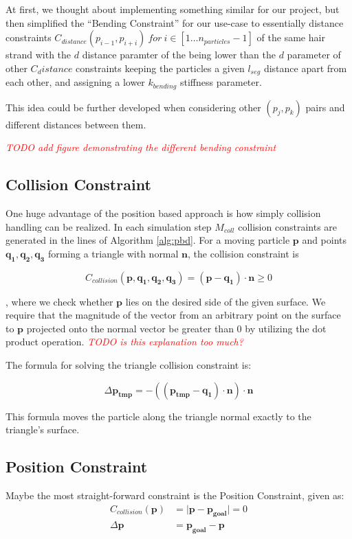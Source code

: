 \documentclass[sigplan,screen,nonacm]{acmart}
\newcommand\TODO[1]{\textcolor{red}{\emph{TODO #1}}}
\renewcommand{\b}{\boldsymbol}
\begin{document}
At first, we thought about implementing something similar for our project, but
then simplified the ``Bending Constraint'' for our use-case to essentially
 distance constraints $C_{distance}(p_{i-1}, p_{i+i})~for~i\in[1 \ldots
n_{particles}-1]$ of the same hair strand with the $d$ distance paramter of the
being lower than the $d$ parameter of other $C_distance$ constraints keeping the
particles a given $l_{seg}$ distance apart from each other, and assigning
a lower $k_{bending}$ stiffness parameter.

This idea could be further developed when considering other $(p_j,p_k)$ pairs
and different distances between them.

\TODO{add figure demonstrating the different bending constraint}

\subsection{Collision Constraint}
One huge advantage of the position based approach is how simply collision
handling can be realized. In each simulation step $M_{coll}$ collision
constraints are generated in the  lines of Algorithm
\ref{alg:pbd}. For a moving particle $\b{p}$ and points $\b{q_1}, \b{q_2},
\b{q_3}$ forming a triangle with normal $\b{n}$, the collision constraint is

$$
C_{collision}(\b{p}, \b{q_1}, \b{q_2}, \b{q_3}) = (\b{p}-\b{q_1})\cdot \b{n} \geq 0
$$

, where we check whether $\b{p}$ lies on the desired side of the given
surface. We require that the magnitude of the vector from an arbitrary point
on the surface to $\b{p}$ projected onto the normal vector be greater than 0 by
utilizing the dot product operation.
\TODO{is this explanation too much?}

The formula for solving the triangle collision constraint is:

$$
\Delta \b{p_{tmp}} = -((\b{p_{tmp}}-\b{q_1})\cdot \b{n})\cdot \b{n}
$$

This formula moves the particle along the triangle normal exactly to the
triangle's surface. 

\subsection{Position Constraint}
Maybe the most straight-forward constraint is the Position Constraint, given as:
\begin{align*}
    C_{collision}(\b{p}) &= \lvert \b{p} - \b{p_{goal}} \rvert = 0
    \\
    \Delta \b{p} &= \b{p_{goal}} - \b{p}
\end{align*}
\end{document}
